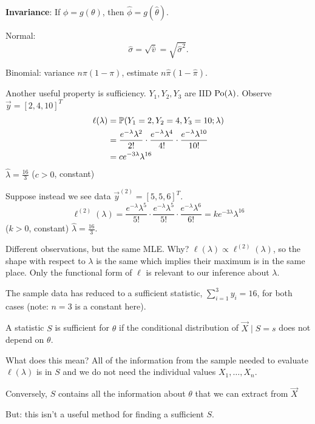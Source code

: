 \documentclass[10pt, a4paper]{article}
\begin{document}
\textbf{Invariance}:
If $\phi = g(\theta)$,
then $\hat{\phi} = g(\hat{\theta})$.

\begin{example}
    Normal:
    \[
    \hat{\sigma} = \sqrt{\hat{v}} = \sqrt{\hat{\sigma} ^ 2}.
    \]

    Binomial:
    variance $n\pi(1 - \pi)$,
    estimate $n\hat{\pi}(1 - \hat{\pi})$.
\end{example}
Another useful property is sufficiency.
$Y_1, Y_2, Y_3$ are IID $\Po(\lambda)$.
Observe $\vec{y} = [2, 4, 10] ^ T$
\begin{align*}
    \ell(\lambda) &= \P(Y_1 = 2, Y_2 = 4, Y_3 = 10; \lambda) \\
    &= \frac{e ^ {-\lambda}\lambda ^ 2}{2!}\cdot\frac{e ^ {-\lambda}\lambda ^ 4}{4!}\cdot\frac{e ^ {-\lambda}\lambda ^ {10}}{10!} \\
    &= ce ^ {-3\lambda}\lambda ^ {16}
\end{align*}
$\hat{\lambda} = \frac{16}{3}$
($c > 0$,
constant)

Suppose instead we see data $\vec{y} ^ (2) = [5, 5, 6] ^ T$.
\[
\ell ^ {(2)}(\lambda) = \frac{e ^ {-\lambda}\lambda ^ 5}{5!} \cdot \frac{e ^ {-\lambda}\lambda ^ 5}{5!} \cdot \frac{e ^ {-\lambda}\lambda ^ 6}{6!} = ke ^ {-3\lambda}\lambda ^ {16}
\]
($k > 0$,
constant)
$\hat{\lambda} = \frac{16}{3}$.

Different observations,
but the same MLE.
Why?
$\ell(\lambda) \propto \ell ^ {(2)}(\lambda)$,
so the shape with respect to $\lambda$ is the same which implies their maximum is in the same place.
Only the functional form of $\ell$ is relevant to our inference about $\lambda$.

The sample data has reduced to a sufficient statistic,
$\sum_{i = 1}^{3}y_i = 16$,
for both cases
(note:
$n = 3$ is a constant here).

\begin{definition}
    A statistic $S$ is sufficient for $\theta$ if the conditional distribution of $\vec{X} \mid S = s$ does not depend on $\theta$.
\end{definition}
What does this mean?
All of the information from the sample needed to evaluate $\ell(\lambda)$ is in $S$ and we do not need the individual values $X_1, \dotsc, X_n$.

Conversely,
$S$ contains all the information about $\theta$ that we can extract from $\vec{X}$

But:
this isn't a useful method for finding a sufficient $S$.
\end{document}
